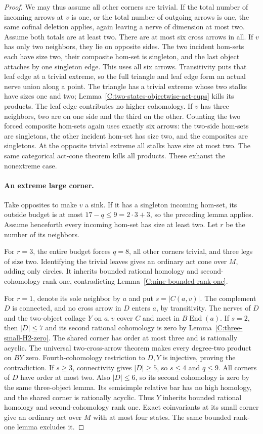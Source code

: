 \begin{proof}
We may thus assume all other corners are trivial. If the
total number of incoming arrows at $v$ is one, or the total
number of outgoing arrows is one, the same cofinal deletion
applies, again leaving a nerve of dimension at most two.
Assume both totals are at least two. There are at
most six cross arrows in all.
If $v$ has only two neighbors, they lie on opposite sides.
The two incident hom-sets each have size two, their composite
hom-set is singleton, and the last object attaches by one
singleton edge. This uses all six arrows. Transitivity puts
that leaf edge at a trivial extreme, so the full triangle and
leaf edge form an actual nerve union along a point. The triangle
has a trivial extreme whose two stalks have sizes one and two;
Lemma~\ref{C:two-states-objectwise-act-cups} kills its products.
The leaf edge contributes no higher cohomology.
If $v$ has three neighbors, two are on one side and the third
on the other. Counting the two forced composite hom-sets
again uses exactly six arrows: the two-side hom-sets are
singletons, the other incident hom-set has size two, and
the composites are singletons. At the opposite trivial
extreme all stalks have size at most two. The same categorical
act-cone theorem kills all products. These exhaust the
nonextreme case.

\paragraph{An extreme large corner.}
Take opposites to make $v$ a sink. If it has a singleton
incoming hom-set, its outside budget is at most
$17-q\leq9=2\cdot3+3$, so the preceding lemma applies.
Assume henceforth every incoming hom-set has size at least two.
Let $r$ be the number of its neighbors.

For $r=3$, the entire budget forces $q=8$, all other corners
trivial, and three legs of size two. Identifying the trivial
leaves gives an ordinary act cone over $M$, adding only circles.
It inherits bounded rational homology and second-cohomology
rank one, contradicting Lemma~\ref{C:nine-bounded-rank-one}.

For $r=1$, denote its sole neighbor by $a$ and put
$s=|C(a,v)|$. The complement $D$ is connected, and no
cross arrow in $D$ enters $a$, by transitivity. The nerves
of $D$ and the two-object collage $Y$ on $a,v$ cover $C$
and meet in $B\operatorname{End}(a)$.
If $s=2$, then $|D|\leq7$ and its second rational cohomology
is zero by Lemma~\ref{C:three-small-H2-zero}. The shared
corner has order at most three and is rationally acyclic.
The universal two-cross-arrow theorem makes every degree-two
product on $BY$ zero. Fourth-cohomology restriction to $D,Y$
is injective, proving the contradiction.
If $s\geq3$, connectivity gives $|D|\geq5$, so $s\leq4$
and $q\leq9$. All corners of $D$ have order at most two.
Also $|D|\leq6$, so its second cohomology is zero by the
same three-object lemma. Its semisimple relative bar has
no high homology, and the
shared corner is rationally acyclic. Thus $Y$ inherits
bounded rational homology and second-cohomology rank one.
Exact coinvariants at its small corner give an ordinary
act over $M$ with at most four states. The same bounded
rank-one lemma excludes it.


\end{proof}
